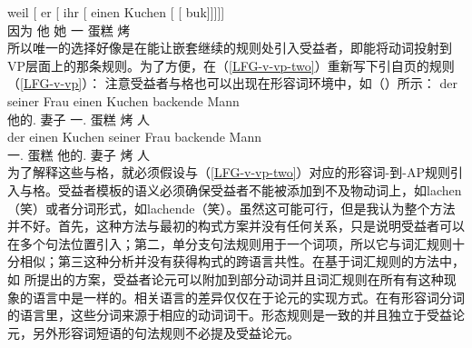 \ea
\gll weil    [ er [ ihr [ einen Kuchen [ [ buk]]]]]\\
     因为 {}        他 {}        她 {}        一 蛋糕       {}        {}       烤\\
\z
所以唯一的选择好像是在能让嵌套继续的规则处引入受益者，即能将动词投射到VP层面上的那条规则。为了方便，在（\ref{LFG-v-vp-two}）重新写下引自\pageref{LFG-v-vp}页的规则（\ref{LFG-v-vp}）：
\ea
\label{LFG-v-vp-two}
\z
注意受益者与格也可以出现在形容词环境中，如（）所示：
\eal
\ex
\gll der seiner Frau einen Kuchen backende Mann\\
      他的.\dat{} 妻子 一.\acc{} 蛋糕 烤 人\\
\ex
\gll der einen Kuchen seiner Frau backende Mann\\
      一.\acc{} 蛋糕  他的.\dat{} 妻子 烤 人\\
\zl
为了解释这些与格，就必须假设与（\ref{LFG-v-vp-two}）对应的形容词-到-AP规则引入与格。受益者模板的语义必须确保受益者不能被添加到不及物动词上，如lachen（笑）或者分词形式，如lachende（笑）。虽然这可能可行，但是我认为整个方法并不好。首先，这种方法与最初的构式方案并没有任何关系，只是说明受益者可以在多个句法位置引入；第二，单分支句法规则用于一个词项，所以它与词汇规则十分相似；第三这种分析并没有获得构式的跨语言共性。在基于词汇规则的方法中，如 \citet[\S~5]{BC99a}所提出的方案，受益者论元可以附加到部分动词并且词汇规则在所有有这种现象的语言中是一样的。相关语言的差异仅仅在于论元的实现方式。在有形容词分词的语言里，这些分词来源于相应的动词词干。形态规则是一致的并且独立于受益论元，另外形容词短语的句法规则不必提及受益论元。
